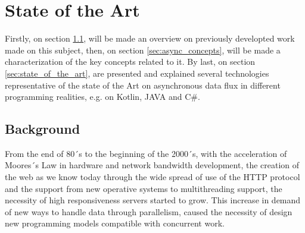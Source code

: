 % 
%  
%
\chapter{State of the Art}
\label{cha:users_manual}

Firstly, on section \ref{sec:related_work}, will be made an overview on previously developted work made on this subject, then, on section \ref{sec:async_concepts}, will be made a characterization of the key concepts related to it. By last, on section \ref{sec:state_of_the_art}, are presented and explained several technologies representative of the state of the Art on asynchronous data flux in different programming realities, e.g. on Kotlin, JAVA and C\#. 


\section{Background} %
\label{sec:related_work}


From the end of 80´s to the beginning of the 2000´s, with the acceleration of Moores´s Law in hardware and network bandwidth development, the creation of the web as we know today through the wide spread of use of the HTTP protocol and the support from new operative systems to multithreading support, the necessity of high responsiveness servers started to grow. This increase in demand of new ways to handle data through parallelism, caused the necessity of design new programming models compatible with concurrent work. 

